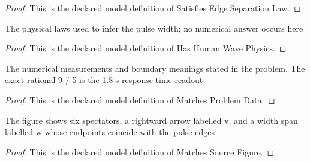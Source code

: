 \begin{proof}
  This is the declared model definition of Satisfies Edge Separation Law.
\end{proof}
\begin{definition}
  \label{def:physics:phyx-mini-0285:phyxminiproblems-problemphyxmini0285-hashumanwavephysics}
  The physical laws used to infer the pulse width; no numerical answer occurs here
\end{definition}
\begin{proof}
  This is the declared model definition of Has Human Wave Physics.
\end{proof}
\begin{definition}
  \label{def:physics:phyx-mini-0285:phyxminiproblems-problemphyxmini0285-matchesproblemdata}
  The numerical measurements and boundary meanings stated in the problem. The exact rational 9 / 5 is the 1.8 s response-time readout
\end{definition}
\begin{proof}
  This is the declared model definition of Matches Problem Data.
\end{proof}
\begin{definition}
  \label{def:physics:phyx-mini-0285:phyxminiproblems-problemphyxmini0285-matchessourcefigure}
  The figure shows six spectators, a rightward arrow labelled v, and a width span labelled w whose endpoints coincide with the pulse edges
\end{definition}
\begin{proof}
  This is the declared model definition of Matches Source Figure.
\end{proof}
